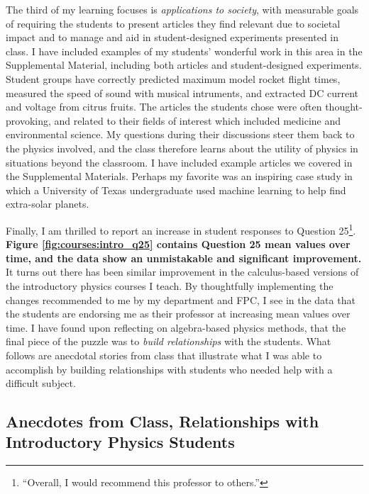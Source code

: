 \documentclass[../../main.tex]{subfiles}
\begin{document}
The third of my learning focuses is \textit{applications to society}, with measurable goals of requiring the students to present articles they find relevant due to societal impact and to manage and aid in student-designed experiments presented in class.  I have included examples of my students' wonderful work in this area in the Supplemental Material, including both articles and student-designed experiments.  Student groups have correctly predicted maximum model rocket flight times, measured the speed of sound with musical intruments, and extracted DC current and voltage from citrus fruits.  The articles the students chose were often thought-provoking, and related to their fields of interest which included medicine and environmental science.  My questions during their discussions steer them back to the physics involved, and the class therefore learns about the utility of physics in situations beyond the classroom.  I have included example articles we covered in the Supplemental Materials.  Perhaps my favorite was an inspiring case study in which a University of Texas undergraduate used machine learning to help find extra-solar planets. \\ \hspace{0.1cm}

Finally, I am thrilled to report an increase in student responses to Question 25\footnote{``Overall, I would recommend this professor to others.''}. \textbf{Figure \ref{fig:courses:intro_q25} contains Question 25 mean values over time, and the data show an unmistakable and significant improvement.}  It turns out there has been similar improvement in the calculus-based versions of the introductory physics courses I teach.  By thoughtfully implementing the changes recommended to me by my department and FPC, I see in the data that the students are endorsing me as their professor at increasing mean values over time.  I have found upon reflecting on algebra-based physics methods, that the final piece of the puzzle was to \textit{build relationships} with the students.  What follows are anecdotal stories from class that illustrate what I was able to accomplish by building relationships with students who needed help with a difficult subject.  \\ \hspace{0.1cm}

\subsection{Anecdotes from Class, Relationships with Introductory Physics Students}
\end{document}
